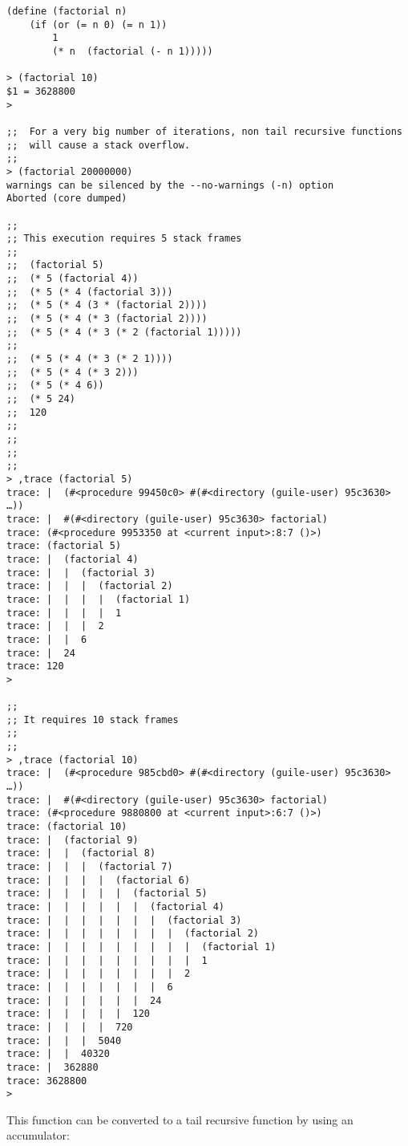 \documentclass[11pt]{article}
\begin{document}
\begin{verbatim}
(define (factorial n)
    (if (or (= n 0) (= n 1))
        1
        (* n  (factorial (- n 1)))))
        
> (factorial 10)
$1 = 3628800
> 

;;  For a very big number of iterations, non tail recursive functions
;;  will cause a stack overflow.
;;
> (factorial 20000000)
warnings can be silenced by the --no-warnings (-n) option
Aborted (core dumped)

;;
;; This execution requires 5 stack frames
;;
;;  (factorial 5)
;;  (* 5 (factorial 4))
;;  (* 5 (* 4 (factorial 3)))
;;  (* 5 (* 4 (3 * (factorial 2))))
;;  (* 5 (* 4 (* 3 (factorial 2))))
;;  (* 5 (* 4 (* 3 (* 2 (factorial 1)))))
;;
;;  (* 5 (* 4 (* 3 (* 2 1))))
;;  (* 5 (* 4 (* 3 2)))
;;  (* 5 (* 4 6))
;;  (* 5 24)
;;  120
;;
;;
;;
;;
> ,trace (factorial 5)
trace: |  (#<procedure 99450c0> #(#<directory (guile-user) 95c3630> …))
trace: |  #(#<directory (guile-user) 95c3630> factorial)
trace: (#<procedure 9953350 at <current input>:8:7 ()>)
trace: (factorial 5)
trace: |  (factorial 4)
trace: |  |  (factorial 3)
trace: |  |  |  (factorial 2)
trace: |  |  |  |  (factorial 1)
trace: |  |  |  |  1
trace: |  |  |  2
trace: |  |  6
trace: |  24
trace: 120
> 

;;
;; It requires 10 stack frames
;;
;;        
> ,trace (factorial 10)
trace: |  (#<procedure 985cbd0> #(#<directory (guile-user) 95c3630> …))
trace: |  #(#<directory (guile-user) 95c3630> factorial)
trace: (#<procedure 9880800 at <current input>:6:7 ()>)
trace: (factorial 10)
trace: |  (factorial 9)
trace: |  |  (factorial 8)
trace: |  |  |  (factorial 7)
trace: |  |  |  |  (factorial 6)
trace: |  |  |  |  |  (factorial 5)
trace: |  |  |  |  |  |  (factorial 4)
trace: |  |  |  |  |  |  |  (factorial 3)
trace: |  |  |  |  |  |  |  |  (factorial 2)
trace: |  |  |  |  |  |  |  |  |  (factorial 1)
trace: |  |  |  |  |  |  |  |  |  1
trace: |  |  |  |  |  |  |  |  2
trace: |  |  |  |  |  |  |  6
trace: |  |  |  |  |  |  24
trace: |  |  |  |  |  120
trace: |  |  |  |  720
trace: |  |  |  5040
trace: |  |  40320
trace: |  362880
trace: 3628800
>
\end{verbatim}

This function can be converted to a tail recursive function by using
an accumulator:
\end{document}
